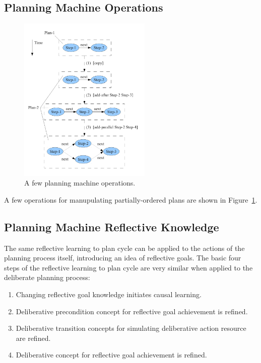 \subsection{Planning Machine Operations}

\begin{figure}[bth]
  \center
  \includegraphics[height=8cm]{gfx/planning_machine_operations}
  \caption[A few planning machine operations]{A few planning machine operations.}
  \label{fig:planning_machine_operations}
\end{figure}

A few operations for manupulating partially-ordered plans are shown in
Figure~\ref{fig:planning_machine_operations}.


\subsection{Planning Machine Reflective Knowledge}

The same reflective learning to plan cycle can be applied to the
actions of the planning process itself, introducing an idea of
reflective goals.  The basic four steps of the reflective learning to
plan cycle are very similar when applied to the deliberate planning
process:

\begin{enumerate}
\item{Changing reflective goal knowledge initiates causal learning.}
\item{Deliberative precondition concept for reflective goal achievement is refined.}
\item{Deliberative transition concepts for simulating deliberative action resource are refined.}
\item{Deliberative concept for reflective goal achievement is refined.}
\end{enumerate}

